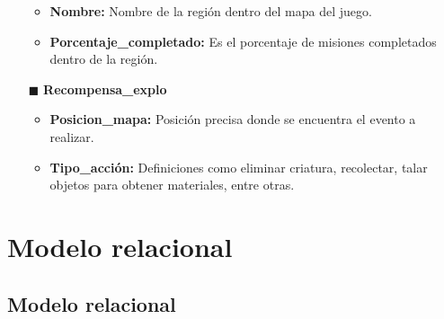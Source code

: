 \documentclass{report}
\begin{document}
\begin{itemize}
        \begin{itemize}
            \item \textbf{Nombre:} Nombre de la región dentro del mapa del juego.
            \item \textbf{Porcentaje\_completado:} Es el porcentaje de misiones completados dentro de la región.
        \end{itemize}
    \item[$\blacksquare$]\textbf{Recompensa\_explo}
        \begin{itemize}
            \item \textbf{Posicion\_mapa: } Posición precisa donde se encuentra el evento a realizar.
            \item \textbf{Tipo\_acción:} Definiciones como eliminar criatura, recolectar, talar objetos para obtener materiales, entre otras.
        \end{itemize}
\end{itemize}

\chapter{Modelo relacional}
\section{Modelo relacional}
\end{document}
